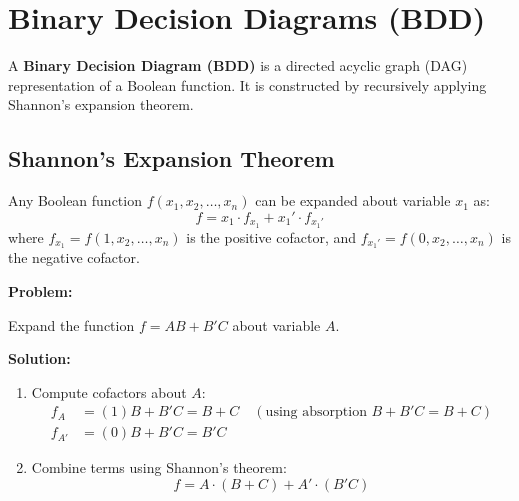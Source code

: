 \documentclass[12pt,a4paper]{article}
\newcommand{\Q}[1]{\textbf{#1}\par\noindent\ignorespaces}
\begin{document}
\section{Binary Decision Diagrams (BDD)}

\begin{tcolorbox}[defbox, title={Binary Decision Diagram}]
  A \textbf{Binary Decision Diagram (BDD)} is a directed acyclic graph (DAG) representation of a Boolean function. It is constructed by recursively applying Shannon's expansion theorem.
\end{tcolorbox}

\subsection{Shannon's Expansion Theorem}
Any Boolean function $f(x_1, x_2, \dots, x_n)$ can be expanded about variable $x_1$ as:
\begin{equation}
  f = x_1 \cdot f_{x_1} + x_1' \cdot f_{x_1'}
\end{equation}
where $f_{x_1} = f(1, x_2, \dots, x_n)$ is the positive cofactor, and $f_{x_1'} = f(0, x_2, \dots, x_n)$ is the negative cofactor.

\begin{tcolorbox}[examplebox, title={Shannon's Expansion Example}]
\Q{Problem:} Expand the function $f = AB + B'C$ about variable $A$.

\textbf{Solution:}\par\noindent
\begin{enumerate}[leftmargin=*, itemsep=2pt]
  \item Compute cofactors about $A$:
        \begin{align*}
          f_A &= (1)B + B'C = B + C \quad (\text{using absorption } B+B'C = B+C) \\
          f_{A'} &= (0)B + B'C = B'C
        \end{align*}
  \item Combine terms using Shannon's theorem:
        \begin{equation*}
          f = A \cdot (B + C) + A' \cdot (B'C)
        \end{equation*}
\end{enumerate}
\end{tcolorbox}
\end{document}
